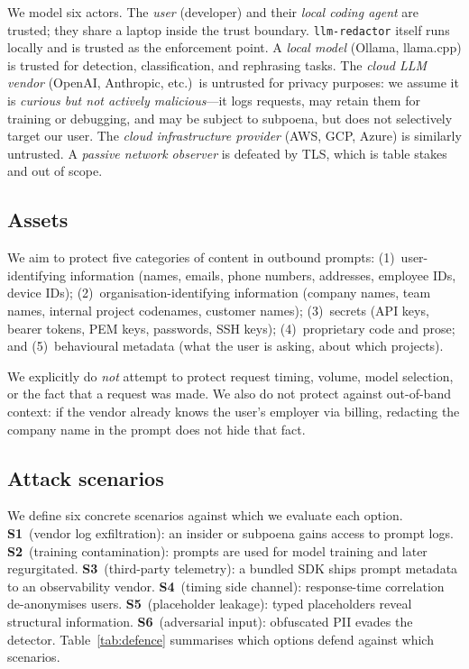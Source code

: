 \documentclass[11pt,a4paper]{article}
\begin{document}
We model six actors.  The \emph{user} (developer) and their
\emph{local coding agent} are trusted; they share a laptop inside
the trust boundary.  \texttt{llm-redactor} itself runs locally and
is trusted as the enforcement point.  A \emph{local model}
(Ollama, llama.cpp) is trusted for detection, classification, and
rephrasing tasks.  The \emph{cloud LLM vendor} (OpenAI, Anthropic,
etc.)\ is untrusted for privacy purposes: we assume it is
\emph{curious but not actively malicious}---it logs requests, may
retain them for training or debugging, and may be subject to
subpoena, but does not selectively target our user.  The
\emph{cloud infrastructure provider} (AWS, GCP, Azure) is
similarly untrusted.  A \emph{passive network observer} is
defeated by TLS, which is table stakes and out of scope.

\subsection{Assets}

We aim to protect five categories of content in outbound prompts:
(1)~user-identifying information (names, emails, phone numbers,
addresses, employee IDs, device IDs);
(2)~organisation-identifying information (company names, team
names, internal project codenames, customer names);
(3)~secrets (API keys, bearer tokens, PEM keys, passwords, SSH
keys);
(4)~proprietary code and prose; and
(5)~behavioural metadata (what the user is asking, about which
projects).

We explicitly do \emph{not} attempt to protect request timing,
volume, model selection, or the fact that a request was made.  We
also do not protect against out-of-band context: if the vendor
already knows the user's employer via billing, redacting the
company name in the prompt does not hide that fact.

\subsection{Attack scenarios}

We define six concrete scenarios against which we evaluate each
option.  \textbf{S1}~(vendor log exfiltration): an insider or
subpoena gains access to prompt logs.  \textbf{S2}~(training
contamination): prompts are used for model training and later
regurgitated.  \textbf{S3}~(third-party telemetry): a bundled SDK
ships prompt metadata to an observability vendor.
\textbf{S4}~(timing side channel): response-time correlation
de-anonymises users.  \textbf{S5}~(placeholder leakage): typed
placeholders reveal structural information.
\textbf{S6}~(adversarial input): obfuscated PII evades the
detector.  Table~\ref{tab:defence} summarises which options defend
against which scenarios.
\end{document}
